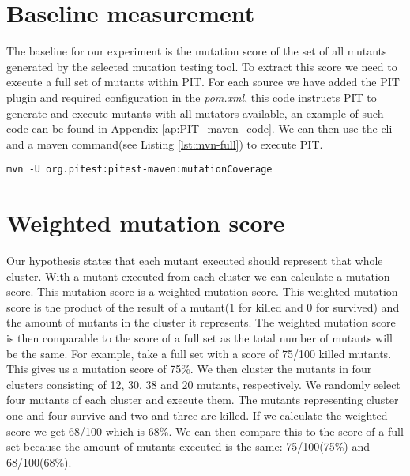 \documentclass[../main]{subfiles}
\begin{document}
\section{Baseline measurement}
The baseline for our experiment is the mutation score of the set of all mutants generated by the selected mutation testing tool.
To extract this score we need to execute a full set of mutants within PIT.
For each source we have added the PIT plugin and required configuration in the \textit{pom.xml}, this code instructs PIT to generate and execute mutants with all mutators available, an example of such code can be found in Appendix \ref{ap:PIT_maven_code}.
We can then use the \acrfull{cli} and a maven command(see Listing \ref{lst:mvn-full}) to execute PIT.
\begin{lstlisting}[label=lst:mvn-full,caption=Command used to execute full set of mutants with PIT.]
mvn -U org.pitest:pitest-maven:mutationCoverage
\end{lstlisting}

\section{Weighted mutation score}
\label{ch:weighted_score}
Our hypothesis states that each mutant executed should represent that whole cluster.
With a mutant executed from each cluster we can calculate a mutation score.
This mutation score is a weighted mutation score.
This weighted mutation score is the product of the result of a mutant(1 for killed and 0 for survived) and the amount of mutants in the cluster it represents.
The weighted mutation score is then comparable to the score of a full set as the total number of mutants will be the same.
\newline
For example, take a full set with a score of 75/100 killed mutants.
This gives us a mutation score of 75\%. 
We then cluster the mutants in four clusters consisting of 12, 30, 38 and 20 mutants, respectively.
We randomly select four mutants of each cluster and execute them.
The mutants representing cluster one and four survive and two and three are killed.
If we calculate the weighted score we get 68/100 which is 68\%.
We can then compare this to the score of a full set because the amount of mutants executed is the same: 75/100(75\%) and 68/100(68\%).
\end{document}
